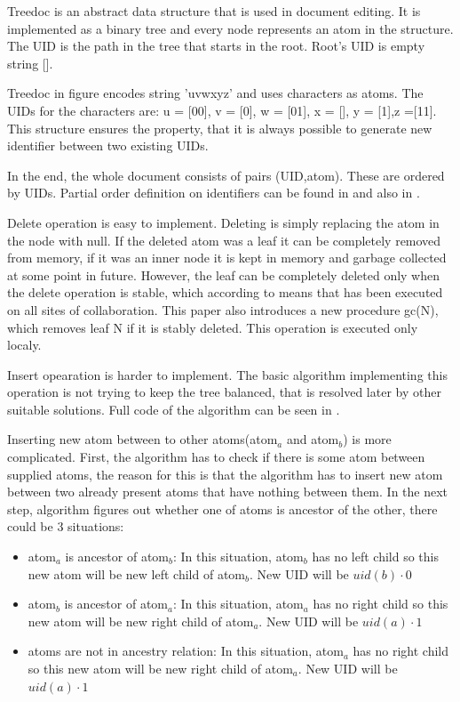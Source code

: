 \documentclass[12pt,oneside]{fithesis2}
\begin{document}
\par Treedoc is an abstract data structure that is used in document editing. It is implemented as a binary tree and every node represents an atom in the structure. The UID is the path in the tree that starts in the root. Root's UID is empty string [].
\par Treedoc in figure encodes string 'uvwxyz' and uses characters as atoms. The UIDs for the characters are: u = [00], v = [0], w = [01], x = [], y = [1],z =[11]. This structure ensures the property, that it is always possible to generate new identifier between two existing UIDs. 
\par In the end, the whole document consists of pairs (UID,atom). These are ordered by UIDs. Partial order definition on identifiers can be found in \cite{Shapiro-design} and also in \cite{Shapiro-editing}. 
\par Delete operation is easy to implement. Deleting is simply replacing the atom in the node with null. If the deleted atom was a leaf it can be completely removed from memory, if it was an inner node it is kept in memory and garbage collected at some point in future. However, the leaf can be completely deleted only when the delete operation is stable, which according to \cite{Shapiro-design} means that has been executed on all sites of collaboration. This paper also introduces a new procedure gc(N), which removes leaf N if it is stably deleted. This operation is executed only localy.
\par Insert opearation is harder to implement. The basic algorithm implementing this operation is not trying to keep the tree balanced, that is resolved later by other suitable solutions. Full code of the algorithm can be seen in \cite{Shapiro-design} \cite{Shapiro-editing}. 
\par Inserting new atom between to other atoms(atom\(_a\) and atom\(_b\)) is more complicated. First, the algorithm has to check if there is some atom between supplied atoms, the reason for this is that the algorithm has to insert new atom between two already present atoms that have nothing between them.
In the next step, algorithm figures out whether one of atoms is ancestor of the other, there could be 3 situations:
\begin{itemize}
\item atom\(_a\) is ancestor of atom\(_b\): In this situation, atom\(_b\) has no left child so this new atom will be new left child of atom\(_b\). New UID will be \(uid(b) \cdot 0\)
\item atom\(_b\) is ancestor of atom\(_a\): In this situation, atom\(_a\) has no right child so this new atom will be new right child of atom\(_a\). New UID will be \(uid(a) \cdot 1\)
\item atoms are not in ancestry relation:  In this situation, atom\(_a\) has no right child so this new atom will be new right child of atom\(_a\). New UID will be \(uid(a) \cdot 1\)
\end{itemize}
\end{document}
